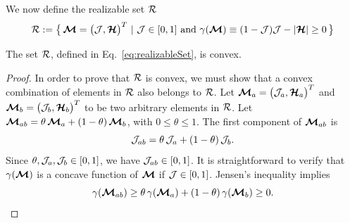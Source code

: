 We now define the realizable set $\mathcal{R}$
\begin{equation}
  \mathcal{R}:=\big\{\,\boldsymbol{\mathcal{M}}=\big(\mathcal{J},\boldsymbol{\mathcal{H}}\big)^{T}~|~\mathcal{J}\in[0,1]~\text{and}~\gamma(\boldsymbol{\mathcal{M}})\equiv(1-\mathcal{J})\mathcal{J}-|\boldsymbol{\mathcal{H}}|\ge0\,\big\}
  \label{eq:realizableSet}
\end{equation}

\begin{lemma}
  The set $\mathcal{R}$, defined in Eq.~\eqref{eq:realizableSet}, is convex.  
\end{lemma}
\begin{proof}
  In order to prove that $\mathcal{R}$ is convex, we must show that a convex combination of elements in $\mathcal{R}$ also belongs to $\mathcal{R}$.  
  Let $\boldsymbol{\mathcal{M}}_{a}=\big(\mathcal{J}_{a},\boldsymbol{\mathcal{H}}_{a}\big)^{T}$ and $\boldsymbol{\mathcal{M}}_{b}=\big(\mathcal{J}_{b},\boldsymbol{\mathcal{H}}_{b}\big)^{T}$ to be two arbitrary elements in $\mathcal{R}$.  
  Let $\boldsymbol{\mathcal{M}}_{ab} = \theta\,\boldsymbol{\mathcal{M}}_{a} + (1-\theta)\,\boldsymbol{\mathcal{M}}_{b}$, with $0\leq\theta\leq1$.
  The first component of $\boldsymbol{\mathcal{M}}_{ab}$ is
  \begin{equation*}
    \mathcal{J}_{ab} = \theta\,\mathcal{J}_{a} + (1-\theta)\,\mathcal{J}_{b}.
  \end{equation*}
  Since $\theta,\mathcal{J}_{a},\mathcal{J}_{b}\in[0,1]$, we have $\mathcal{J}_{ab} \in [0,1]$.  
  It is straightforward to verify that $\gamma(\boldsymbol{\mathcal{M}})$ is a concave function of $\boldsymbol{\mathcal{M}}$ if $\mathcal{J}\in[0,1]$.
  Jensen's inequality implies
  \begin{equation*}
  \gamma(\boldsymbol{\mathcal{M}}_{ab}) \geq \theta\,\gamma(\boldsymbol{\mathcal{M}}_{a}) + (1-\theta)\,\gamma(\boldsymbol{\mathcal{M}}_{b}) \ge0.
  \end{equation*}
\end{proof}

